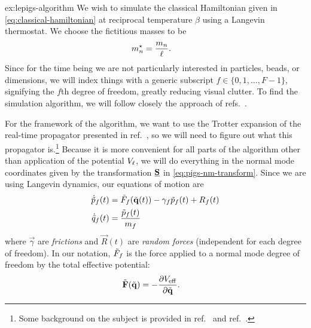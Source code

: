 \begin{DefAnswer}{ex:lepigs-algorithm}
	We wish to simulate the classical Hamiltonian given in \vref{eq:classical-hamiltonian} at reciprocal temperature $\beta$ using a Langevin thermostat.
	We choose the fictitious masses to be
	\begin{align}
		{m}^\star_n
		&= \frac{m_n}{\ell}.
	\end{align}
	Since for the time being we are not particularly interested in particles, beads, or dimensions, we will index things with a generic subscript $f \in \{ 0, 1, \ldots, F - 1 \}$, signifying the $f$th degree of freedom, greatly reducing visual clutter.
	To find the simulation algorithm, we will follow closely the approach of refs.~\cite{bussi2007accurate,ceriotti2010efficient}.

	For the framework of the algorithm, we want to use the Trotter expansion of the real-time propagator presented in ref.~\cite{tuckerman1992reversible}, so we will need to figure out what this propagator is.\footnote{
		Some background on the subject is provided in ref.~\cite[44-50]{evans2008statistical} and ref.~\cite[31-35]{zwanzig2001nonequilibrium}.
	}
	Because it is more convenient for all parts of the algorithm other than application of the potential $V_\ell$, we will do everything in the normal mode coordinates given by the transformation $\underline{\bm{\mathbf{S}}}$ in \vref{eq:pigs-nm-transform}.
	Since we are using Langevin dynamics, our equations of motion are~\cite{kubo1966fluctuation}
	\begin{subequations} \label{eq:langevin-eom}
	\begin{align}
		\dot{\tilde{p}}_f(t)
		&= \tilde{F}_f(\tilde{\bm{\mathbf{q}}}(t)) - \gamma_f \tilde{p}_f(t) + R_f(t)
			\label{eq:langevin-eom-p} \\
		\dot{\tilde{q}}_f(t)
		&= \frac{\tilde{p}_f(t)}{m_f}
	\end{align}
	\end{subequations}
	where $\vec{\gamma}$ are \emph{frictions} and $\vec{R}(t)$ are \emph{random forces} (independent for each degree of freedom).
	In our notation, $\tilde{F}_f$ is the force applied to a normal mode degree of freedom by the total effective potential:
	\begin{align}
		\tilde{\bm{\mathbf{F}}}(\tilde{\bm{\mathbf{q}}})
		&= -\frac{\partial V_\mathrm{eff}}{\partial \tilde{\bm{\mathbf{q}}}}.
	\end{align}


\end{DefAnswer}
